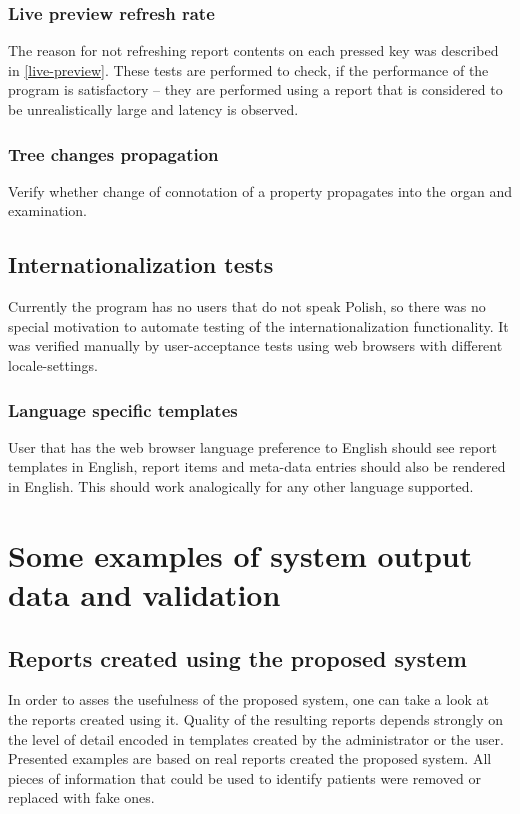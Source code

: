 \documentclass[12pt, twoside, openany]{report}
\theoremstyle{definition}
\begin{document}
	\subsection{Live preview refresh rate}
	The reason for not refreshing report contents on each pressed key was described in \ref{live-preview}. These tests are performed to check, if the performance of the program is satisfactory – they are performed using a report that is considered to be unrealistically large and latency is observed. 
	\subsection{Tree changes propagation}
	Verify whether change of connotation of a property propagates into the organ and examination.
	


\section{Internationalization tests}
Currently the program has no users that do not speak Polish, so there was no special motivation to automate testing of the internationalization functionality. It was verified manually by user-acceptance tests using web browsers with different locale-settings.
\subsection{Language specific templates}
User that has the web browser language preference to English should see report templates in English, report items and meta-data entries should also be rendered in English. This should work analogically for any other language supported.


\chapter{Some examples of system output data and validation}
\section{Reports created using the proposed system}
In order to asses the usefulness of the proposed system, one can take a look at the reports created using it. Quality of the resulting reports depends strongly on the level of detail encoded in templates created by the administrator or the user. Presented examples are based on real reports created the proposed system. All pieces of information that could be used to identify patients were removed or replaced with fake ones.
\end{document}
